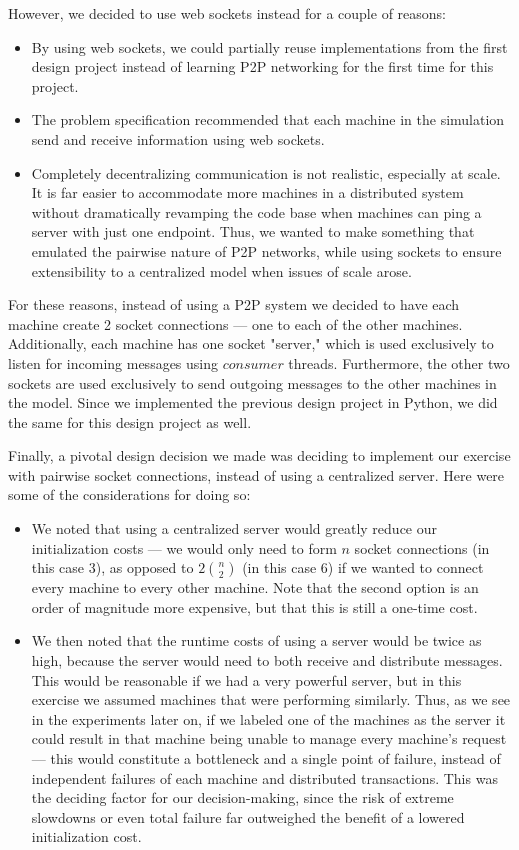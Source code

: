 \documentclass[
	a4paper, %
	10pt, %
	unnumberedsections, %
	twoside, %
]{LTJournalArticle}
\begin{document}
However, we decided to use web sockets instead for a couple of reasons: 
\begin{itemize}
    \item By using web sockets, we could partially reuse implementations from the first design project instead of learning P2P networking for the first time for this project. 
    \item The problem specification recommended that each machine in the simulation send and receive information using web sockets. 
    \item Completely decentralizing communication is not realistic, especially at scale. It is far easier to accommodate more machines in a distributed system without dramatically revamping the code base when machines can ping a server with just one endpoint. Thus, we wanted to make something that emulated the pairwise nature of P2P networks, while using sockets to ensure extensibility to a centralized model when issues of scale arose.
\end{itemize}

For these reasons, instead of using a P2P system we decided to have each machine create 2 socket connections --- one to each of the other machines. Additionally, each machine has one socket "server," which is used exclusively to listen for incoming messages using $consumer$ threads. Furthermore, the other two sockets are used exclusively to send outgoing messages to the other machines in the model. Since we implemented the previous design project in Python, we did the same for this design project as well. 

Finally, a pivotal design decision we made was deciding to implement our exercise with pairwise socket connections, instead of using a centralized server. Here were some of the considerations for doing so: 
\begin{itemize}
    \item We noted that using a centralized server would greatly reduce our initialization costs --- we would only need to form $n$ socket connections (in this case 3), as opposed to $2{n \choose 2}$ (in this case 6) if we wanted to connect every machine to every other machine. Note that the second option is an order of magnitude more expensive, but that this is still a one-time cost. 
    \item We then noted that the runtime costs of using a server would be twice as high, because the server would need to both receive and distribute messages. This would be reasonable if we had a very powerful server, but in this exercise we assumed machines that were performing similarly. Thus, as we see in the experiments later on, if we labeled one of the machines as the server it could result in that machine being unable to manage every machine's request --- this would constitute a bottleneck and a single point of failure, instead of independent failures of each machine and distributed transactions. This was the deciding factor for our decision-making, since the risk of extreme slowdowns or even total failure far outweighed the benefit of a lowered initialization cost.
\end{itemize}
\end{document}
